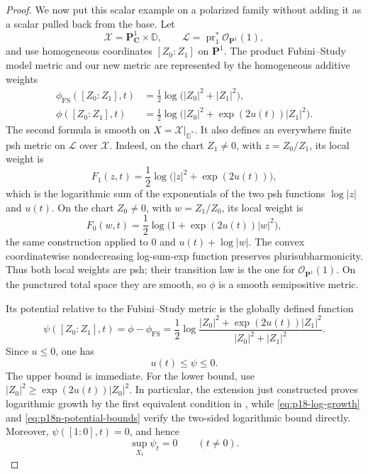 \begin{proof}
We now put this scalar example on a polarized family without adding it as
a scalar pulled back from the base.  Let
\[
 \mathcal X=\mathbf P^1_{\mathbf C}\times\mathbb D,\qquad
 \mathcal L=\operatorname{pr}_1^*\mathcal O_{\mathbf P^1}(1),
\]
and use homogeneous coordinates \([Z_0:Z_1]\) on \(\mathbf P^1\).
The product Fubini--Study model metric and our new metric are represented
by the homogeneous additive weights
\[
\begin{aligned}
 \phi_{\mathrm{FS}}([Z_0:Z_1],t)
   &=\frac12\log\bigl(|Z_0|^2+|Z_1|^2\bigr),\\
 \phi([Z_0:Z_1],t)
   &=\frac12\log\bigl(|Z_0|^2+\exp(2u(t))|Z_1|^2\bigr).
\end{aligned}
\tag{66.20n}\label{eq:p18n-metrics}
\]
The second formula is smooth on
\(X=\mathcal X|_{\mathbb D^*}\).  It also defines an everywhere finite
psh metric on \(\mathcal L\) over \(\mathcal X\).  Indeed, on the chart
\(Z_1\ne0\), with \(z=Z_0/Z_1\), its local weight is
\[
 F_1(z,t)=\frac12\log\bigl(|z|^2+\exp(2u(t))\bigr),
\tag{66.20o}\label{eq:p18n-weight-one}
\]
which is the logarithmic sum of the exponentials of the two psh
functions \(\log|z|\) and \(u(t)\).  On the chart \(Z_0\ne0\), with
\(w=Z_1/Z_0\), its local weight is
\[
 F_0(w,t)=\frac12\log\bigl(1+\exp(2u(t))|w|^2\bigr),
\tag{66.20p}\label{eq:p18n-weight-zero}
\]
the same construction applied to \(0\) and \(u(t)+\log|w|\).
The convex coordinatewise nondecreasing log-sum-exp function preserves
plurisubharmonicity.  Thus both local weights are psh; their transition
law is the one for \(\mathcal O_{\mathbf P^1}(1)\).  On the punctured
total space they are smooth, so \(\phi\) is a smooth semipositive metric.

Its potential relative to the Fubini--Study metric is the globally
defined function
\[
 \psi([Z_0:Z_1],t)
 =\phi-\phi_{\mathrm{FS}}
 =\frac12\log
   \frac{|Z_0|^2+\exp(2u(t))|Z_1|^2}
        {|Z_0|^2+|Z_1|^2}.
\tag{66.20q}\label{eq:p18n-relative-potential}
\]
Since \(u\leq0\), one has
\[
                         u(t)\leq\psi\leq0.
\tag{66.20r}\label{eq:p18n-potential-bounds}
\]
The upper bound is immediate.  For the lower bound, use
\(|Z_0|^2\geq\exp(2u(t))|Z_0|^2\).  In particular, the extension just
constructed proves logarithmic growth by the first equivalent condition
in \cite[Definition~3.9]{PS23Hybrid}, while
\eqref{eq:p18-log-growth} and \eqref{eq:p18n-potential-bounds} verify
the two-sided logarithmic bound directly.  Moreover,
\(\psi([1:0],t)=0\), and hence
\[
                   \sup_{X_t}\psi_t=0\qquad(t\ne0).
\tag{66.20s}\label{eq:p18n-complex-normalization}
\]


\end{proof}
